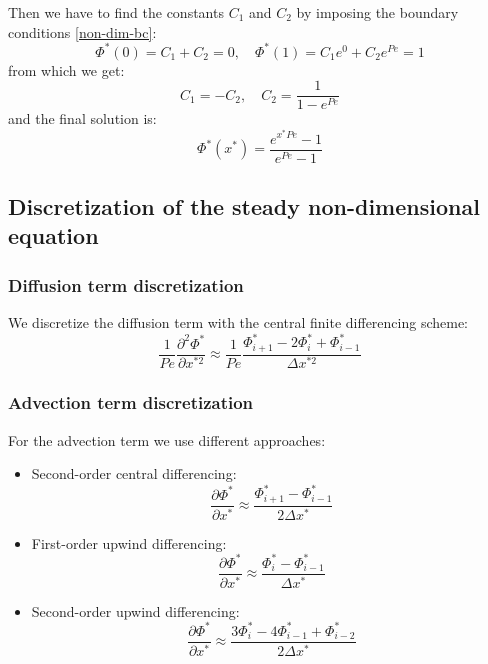 \documentclass{article}
\begin{document}
Then we have to find the constants $C_1$ and $C_2$ by imposing the boundary conditions \eqref{non-dim-bc}:
\[
    \Phi^*(0) = C_1 + C_2 = 0, \quad \Phi^*(1) = C_1 e^{0} + C_2 e^{Pe} = 1
\]
from which we get:
\[
    C_1 = - C_2, \quad C_2 = \frac{1}{1 - e^{Pe}}
\]
and the final solution is:
\begin{equation} \label{analyticalsolution}
    \Phi^*(x^*) = \frac{e^{x^* Pe} - 1}{e^{Pe} - 1}
\end{equation}

\subsection{Discretization of the steady non-dimensional equation}
\subsubsection*{Diffusion term discretization}
We discretize the diffusion term with the central finite differencing scheme:
\begin{equation} \label{diffusion}
    \frac{1}{Pe} \frac{\partial^2 \Phi^*}{\partial x^{*2}} \approx \frac{1}{Pe} \frac{\Phi^*_{i+1} - 2 \Phi^*_i + \Phi^*_{i-1}}{\Delta x^{*2}}
\end{equation}

\subsubsection*{Advection term discretization}
For the advection term we use different approaches:
\begin{itemize}
\item Second-order central differencing: 
\begin{equation} \label{advection}
    \frac{\partial \Phi^*}{\partial x^*} \approx \frac{\Phi^*_{i+1} - \Phi^*_{i-1}}{2 \Delta x^*}
\end{equation}

\item First-order upwind differencing:
\begin{equation} \label{upwind}
    \frac{\partial \Phi^*}{\partial x^*} \approx \frac{\Phi^*_{i} - \Phi^*_{i-1}}{\Delta x^*}
\end{equation}
\item Second-order upwind differencing:
\begin{equation} \label{upwind2}
    \frac{\partial \Phi^*}{\partial x^*} \approx \frac{3 \Phi^*_{i} - 4 \Phi^*_{i-1} + \Phi^*_{i-2}}{2 \Delta x^*}
\end{equation}
\end{itemize}
\end{document}
